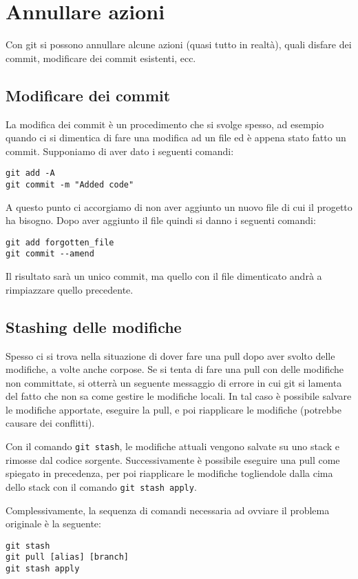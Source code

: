 \documentclass[a4paper, 11pt]{article}
\begin{document}
	\section{Annullare azioni}
	Con git si possono annullare alcune azioni (quasi tutto in realtà), quali disfare dei commit, modificare dei commit esistenti, ecc.
	
	\subsection{Modificare dei commit}
	La modifica dei commit è un procedimento che si svolge spesso, ad esempio quando ci si dimentica di fare una modifica ad un file ed è appena stato fatto un commit. Supponiamo di aver dato i seguenti comandi: \begin{lstlisting}
git add -A
git commit -m "Added code"
	\end{lstlisting}
	
	A questo punto ci accorgiamo di non aver aggiunto un nuovo file di cui il progetto ha bisogno. Dopo aver aggiunto il file quindi si danno i seguenti comandi: \begin{lstlisting}
git add forgotten_file
git commit --amend
	\end{lstlisting}
	
	Il risultato sarà un unico commit, ma quello con il file dimenticato andrà a rimpiazzare quello precedente.
	
	\subsection{Stashing delle modifiche}
	Spesso ci si trova nella situazione di dover fare una pull dopo aver svolto delle modifiche, a volte anche corpose. Se si tenta di fare una pull con delle modifiche non committate, si otterrà un seguente messaggio di errore in cui git si lamenta del fatto che non sa come gestire le modifiche locali. In tal caso è possibile salvare le modifiche apportate, eseguire la pull, e poi riapplicare le modifiche (potrebbe causare dei conflitti).
	
	Con il comando \lstinline|git stash|, le modifiche attuali vengono salvate su uno stack e rimosse dal codice sorgente. Successivamente è possibile eseguire una pull come spiegato in precedenza, per poi riapplicare le modifiche togliendole dalla cima dello stack con il comando \lstinline|git stash apply|.
	
	Complessivamente, la sequenza di comandi necessaria ad ovviare il problema originale è la seguente:
	\begin{lstlisting}
git stash
git pull [alias] [branch]
git stash apply
	\end{lstlisting}
	\newpage
	\renewcommand{\arraystretch}{1.1}
		
\end{document}
